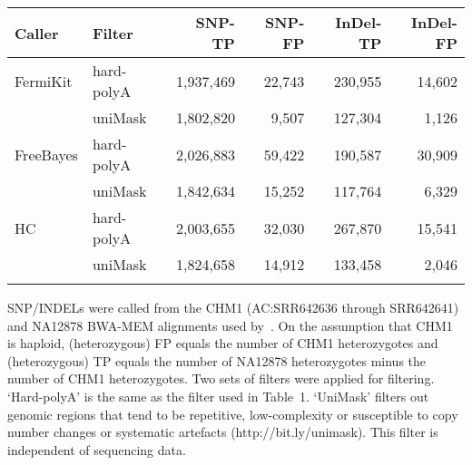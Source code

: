 \documentclass{bioinfo}
\begin{document}
\begin{table}[t]
{\footnotesize
\begin{tabular}{llrrrr}
\toprule
Caller   & Filter     & SNP-TP    & SNP-FP & InDel-TP & InDel-FP \\
\midrule
FermiKit & hard-polyA & 1,937,469 & 22,743 & 230,955 & 14,602 \\
         & uniMask    & 1,802,820 & 9,507  & 127,304 & 1,126 \\
FreeBayes& hard-polyA & 2,026,883 & 59,422 & 190,587 & 30,909 \\
         & uniMask    & 1,842,634 & 15,252 & 117,764 & 6,329 \\
HC       & hard-polyA & 2,003,655 & 32,030 & 267,870 & 15,541 \\
         & uniMask    & 1,824,658 & 14,912 & 133,458 & 2,046 \\
\botrule
\end{tabular}}{SNP/INDELs were called from the CHM1 (AC:SRR642636 through SRR642641) and NA12878 BWA-MEM
alignments used by~\citet{Li:2014aa}. On the assumption that CHM1 is haploid,
(heterozygous) FP equals the number of CHM1 heterozygotes and (heterozygous) TP
equals the number of NA12878 heterozygotes minus the number of CHM1
heterozygotes. Two sets of filters were applied for filtering. `Hard-polyA' is
the same as the filter used in Table~1.  `UniMask' filters out genomic regions
that tend to be repetitive, low-complexity or susceptible to copy number
changes or systematic artefacts (http://bit.ly/unimask). This filter is
independent of sequencing data.}
\end{table}
\end{document}
